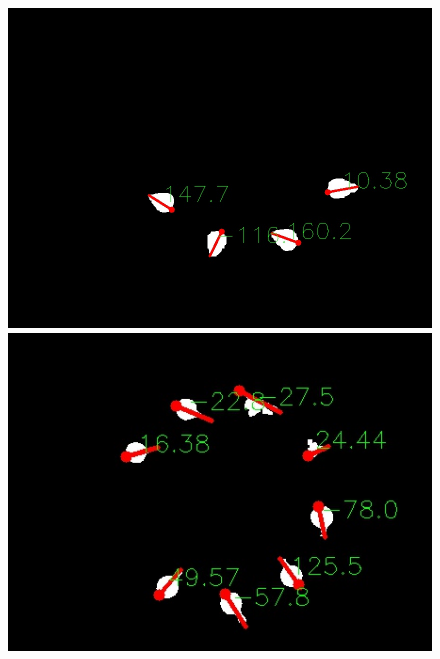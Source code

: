 \documentclass[a4paper]{ctexart}
\begin{document}
\begin{figure}[htbp]
\begin{minipage}[t]{0.25\textwidth}
		\includegraphics[width=\textwidth]{figure/point_to/img3.jpg}
	\end{minipage}
	\begin{minipage}[t]{0.25\textwidth}
		\centering
		\includegraphics[width=\textwidth]{figure/point_to/img4.jpg}
	\end{minipage}
	\begin{minipage}[t]{0.25\textwidth}
		\centering

\end{minipage}
\end{figure}
\end{document}
